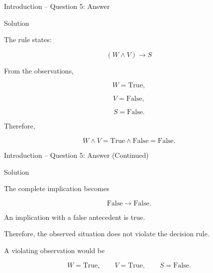 \begin{frame}{Introduction -- Question 5: Answer}

\begin{exampleblock}{Solution}

The rule states:

\[
\boxed{(W\land V)\rightarrow S}
\]

From the observations,

\[
W=\mathrm{True},
\]

\[
V=\mathrm{False},
\]

\[
S=\mathrm{False}.
\]

Therefore,

\[
W\land V
=
\mathrm{True}\land\mathrm{False}
=
\mathrm{False}.
\]

\end{exampleblock}

\end{frame}


\begin{frame}{Introduction -- Question 5: Answer (Continued)}

\begin{exampleblock}{Solution}

The complete implication becomes

\[
\mathrm{False}\rightarrow\mathrm{False}.
\]

An implication with a false antecedent is true.

Therefore, the observed situation does not violate the decision rule.

\medskip

A violating observation would be

\[
W=\mathrm{True},
\qquad
V=\mathrm{True},
\qquad
S=\mathrm{False}.
\]

\end{exampleblock}

\end{frame}


